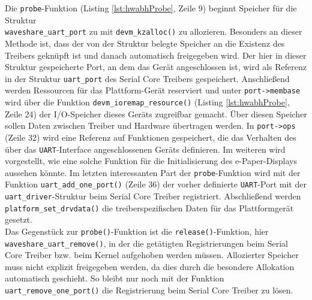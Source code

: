 Die \texttt{probe}-Funktion (Listing \ref{lst:hwabhProbe}, Zeile 9) beginnt Speicher für die Struktur \\ 
\texttt{waveshare\_uart\_port} zu mit \texttt{devm\_kzalloc()} zu allozieren. Besonders an dieser Methode ist, dass der von der Struktur belegte Speicher an die Existenz des Treibers geknüpft ist und danach automatisch freigegeben wird. 
Der hier in dieser Struktur gespeicherte Port, an dem das Gerät angeschlossen ist, wird als Referenz in der Struktur \texttt{uart\_port} des Serial Core Treibers gespeichert. Anschließend werden Ressourcen für das Plattform-Gerät reserviert und unter \texttt{port->membase} wird über die Funktion \texttt{devm\_ioremap\_resource()} (Listing \ref{lst:hwabhProbe}, Zeile 24) der I/O-Speicher dieses Geräts zugreifbar gemacht. Über diesen Speicher sollen Daten zwischen Treiber und Hardware übertragen werden. 
In \texttt{port->ops} (Zeile 32) wird eine Referenz auf Funktionen gespeichert, die das Verhalten des über das \texttt{UART}-Interface angeschlossenen Geräts definieren. Im weiteren wird vorgestellt, wie eine solche Funktion für die Initialisierung des e-Paper-Displays aussehen könnte.
Im letzten interessanten Part der \texttt{probe}-Funktion wird mit der Funktion \texttt{uart\_add\_one\_port()} (Zeile 36) der vorher definierte \texttt{UART}-Port mit der \texttt{uart\_driver}-Struktur beim Serial Core Treiber registriert. 
Abschließend werden \texttt{platform\_set\_drvdata()} die treiberspezifischen Daten für das Plattformgerät gesetzt. \\

Das Gegenstück zur \texttt{probe()}-Funktion ist die \texttt{release()}-Funktion, hier \\ 
\texttt{waveshare\_uart\_remove()}, in der die getätigten Registrierungen beim Serial Core Treiber bzw. beim Kernel aufgehoben werden müssen. Allozierter Speicher muss nicht explizit freigegeben werden, da dies durch die besondere Allokation automatisch geschieht. So bleibt nur noch mit der Funktion \texttt{uart\_remove\_one\_port()} die Registrierung beim Serial Core Treiber zu lösen. 

